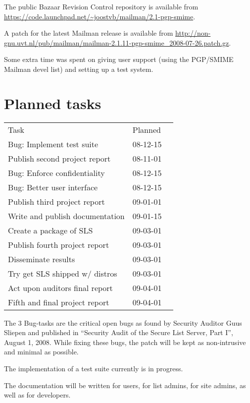 \documentclass[a4]{article}
\begin{document}
The public Bazaar Revision Control repository is available from
\url{https://code.launchpad.net/~joostvb/mailman/2.1-pgp-smime}.

A patch for the latest Mailman release is available from
\url{http://non-gnu.uvt.nl/pub/mailman/mailman-2.1.11-pgp-smime_2008-07-26.patch.gz}.

Some extra time was spent on giving user support (using the PGP/SMIME Mailman
devel list) and setting up a test system.

\section{Planned tasks}

\begin{tabular}{lll}
 Task                            & Planned  \\ \cline{1-2}
 Bug: Implement test suite       & 08-12-15 \\
 Publish second project report   & 08-11-01 \\
 Bug: Enforce confidentiality    & 08-12-15 \\
 Bug: Better user interface      & 08-12-15 \\
 Publish third project report    & 09-01-01 \\
 Write and publish documentation & 09-01-15 \\
 Create a package of SLS         & 09-03-01 \\
 Publish fourth project report   & 09-03-01 \\
 Disseminate results             & 09-03-01 \\
 Try get SLS shipped w/ distros  & 09-03-01 \\
 Act upon auditors final report  & 09-04-01 \\
 Fifth and final project report  & 09-04-01 \\

\end{tabular}

The 3 Bug-tasks are the critical open bugs as found by Security Auditor Guus
Sliepen and published in ``Security Audit of the Secure List Server, Part I'',
August 1, 2008.  While fixing these bugs, the patch will be kept as
non-intrusive and minimal as possible.

The implementation of a test suite currently is in progress.

The documentation will be written for users, for list admins, for site admins,
as well as for developers.
\end{document}
